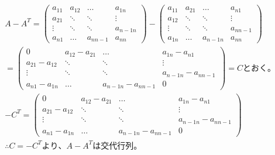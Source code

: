 \documentclass[dvipdfmx,uplatex]{jsarticle}
\begin{document}
  \begin{equation}
    \begin{aligned}
        &A - A^{T} = \left(
          \begin{array}{cccc}
          a_{11} & a_{12} & \ldots & a_{1n} \\
          a_{21} & \ddots & \ddots & \vdots \\
          \vdots & \ddots & \ddots & a_{n-1n} \\
          a_{n1} & \ldots & a_{nn-1} & a_{nn}
          \end{array}
          \right) - 
          \left(
          \begin{array}{cccc}
          a_{11} & a_{21} & \ldots & a_{n1} \\
          a_{12} & \ddots & \ddots & \vdots \\
          \vdots & \ddots & \ddots & a_{nn-1} \\
          a_{1n} & \ldots & a_{n-1n} & a_{nn}
          \end{array}
          \right) \nonumber\\
        &= \left(
          \begin{array}{cccc}
          0 & a_{12} - a_{21} & \ldots & a_{1n} - a_{n1} \\
          a_{21} - a_{12} & \ddots & \ddots & \vdots \\
          \vdots & \ddots & \ddots & a_{n-1n} - a_{nn-1} \\
          a_{n1} - a_{1n} & \ldots & a_{n-1n} - a_{nn-1} & 0
          \end{array}
          \right) = C とおく。\nonumber\\
        & -C^{T} = \left(
          \begin{array}{cccc}
          0 & a_{12} - a_{21} & \ldots & a_{1n} - a_{n1} \\
          a_{21} - a_{12} & \ddots & \ddots & \vdots \\
          \vdots & \ddots & \ddots & a_{n-1n} - a_{nn-1} \\
          a_{n1} - a_{1n} & \ldots & a_{n-1n} - a_{nn-1} & 0
          \end{array}
          \right)\nonumber\\
        & \therefore C=-C^{T}より、A - A^{T}は交代行列。\nonumber\\
    \end{aligned}
  \end{equation}
\end{document}
